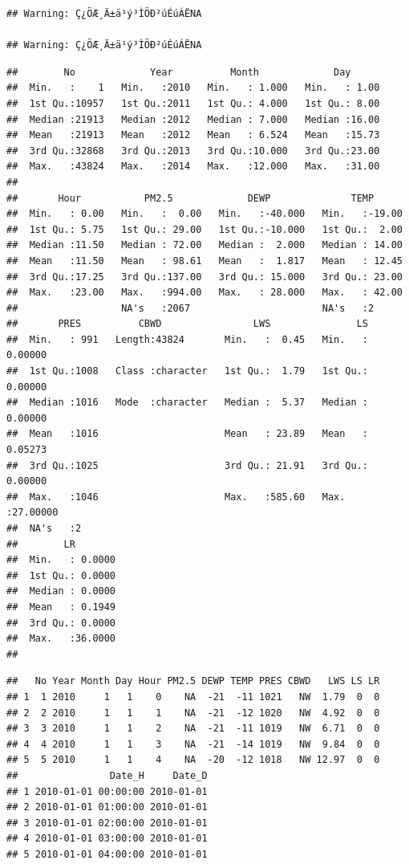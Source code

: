 \documentclass[
]{article}
\begin{document}
\begin{verbatim}
## Warning: Ç¿ÖÆ¸Ä±ä¹ý³ÌÖÐ²úÉúÁËNA

## Warning: Ç¿ÖÆ¸Ä±ä¹ý³ÌÖÐ²úÉúÁËNA
\end{verbatim}

\begin{verbatim}
##        No             Year          Month             Day       
##  Min.   :    1   Min.   :2010   Min.   : 1.000   Min.   : 1.00  
##  1st Qu.:10957   1st Qu.:2011   1st Qu.: 4.000   1st Qu.: 8.00  
##  Median :21913   Median :2012   Median : 7.000   Median :16.00  
##  Mean   :21913   Mean   :2012   Mean   : 6.524   Mean   :15.73  
##  3rd Qu.:32868   3rd Qu.:2013   3rd Qu.:10.000   3rd Qu.:23.00  
##  Max.   :43824   Max.   :2014   Max.   :12.000   Max.   :31.00  
##                                                                 
##       Hour           PM2.5             DEWP              TEMP       
##  Min.   : 0.00   Min.   :  0.00   Min.   :-40.000   Min.   :-19.00  
##  1st Qu.: 5.75   1st Qu.: 29.00   1st Qu.:-10.000   1st Qu.:  2.00  
##  Median :11.50   Median : 72.00   Median :  2.000   Median : 14.00  
##  Mean   :11.50   Mean   : 98.61   Mean   :  1.817   Mean   : 12.45  
##  3rd Qu.:17.25   3rd Qu.:137.00   3rd Qu.: 15.000   3rd Qu.: 23.00  
##  Max.   :23.00   Max.   :994.00   Max.   : 28.000   Max.   : 42.00  
##                  NA's   :2067                       NA's   :2       
##       PRES          CBWD                LWS               LS          
##  Min.   : 991   Length:43824       Min.   :  0.45   Min.   : 0.00000  
##  1st Qu.:1008   Class :character   1st Qu.:  1.79   1st Qu.: 0.00000  
##  Median :1016   Mode  :character   Median :  5.37   Median : 0.00000  
##  Mean   :1016                      Mean   : 23.89   Mean   : 0.05273  
##  3rd Qu.:1025                      3rd Qu.: 21.91   3rd Qu.: 0.00000  
##  Max.   :1046                      Max.   :585.60   Max.   :27.00000  
##  NA's   :2                                                            
##        LR         
##  Min.   : 0.0000  
##  1st Qu.: 0.0000  
##  Median : 0.0000  
##  Mean   : 0.1949  
##  3rd Qu.: 0.0000  
##  Max.   :36.0000  
## 
\end{verbatim}

\begin{verbatim}
##   No Year Month Day Hour PM2.5 DEWP TEMP PRES CBWD   LWS LS LR
## 1  1 2010     1   1    0    NA  -21  -11 1021   NW  1.79  0  0
## 2  2 2010     1   1    1    NA  -21  -12 1020   NW  4.92  0  0
## 3  3 2010     1   1    2    NA  -21  -11 1019   NW  6.71  0  0
## 4  4 2010     1   1    3    NA  -21  -14 1019   NW  9.84  0  0
## 5  5 2010     1   1    4    NA  -20  -12 1018   NW 12.97  0  0
##                Date_H     Date_D
## 1 2010-01-01 00:00:00 2010-01-01
## 2 2010-01-01 01:00:00 2010-01-01
## 3 2010-01-01 02:00:00 2010-01-01
## 4 2010-01-01 03:00:00 2010-01-01
## 5 2010-01-01 04:00:00 2010-01-01
\end{verbatim}
\end{document}
